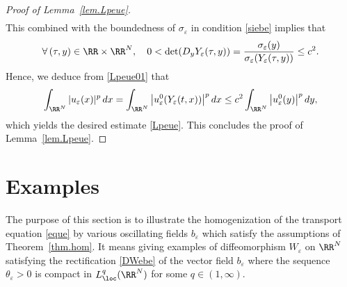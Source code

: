 \begin{proof}[Proof of Lemma~\ref{lem.Lpeue}]
\begin{multline*}
\end{multline*}
This combined with the boundedness of $\sigma_\varepsilon$ in condition \eqref{siebe} implies that
\[
\forall\,(\tau,y)\in\RR\times\RR^N,\quad 0<\det(D_y Y_\varepsilon(\tau,y))= \dfrac{\sigma_\varepsilon(y)}{\sigma_\varepsilon(Y_\varepsilon(\tau,y))}\leq c^2.
\]
Hence, we deduce from \eqref{Lpeue01} that
\[
\int_{\RR^N}|u_\varepsilon(x)|^p\,dx=\int_{\RR^N}\big|u_\varepsilon^0(Y_\varepsilon(t,x))\big|^p\,dx\leq c^2\int_{\RR^N}\big|u_\varepsilon^0(y)\big|^p\,dy,
\]
which yields the desired estimate \eqref{Lpeue}. This concludes the proof of Lemma~\ref{lem.Lpeue}.
\end{proof}


\section{Examples}\label{s.exa}
The purpose of this section is to illustrate the homogenization of the transport equation \eqref{eque} by various oscillating fields $b_\varepsilon$ which satisfy the assumptions of Theorem~\ref{thm.hom}. It means giving examples of diffeomorphism $W_\varepsilon$ on $\RR^N$ satisfying the rectification \eqref{DWebe} of the vector field $b_\varepsilon$ where the sequence $\theta_\varepsilon>0$ is compact in $L^q_\loc(\RR^N)$ for some $q\in(1,\infty)$.

